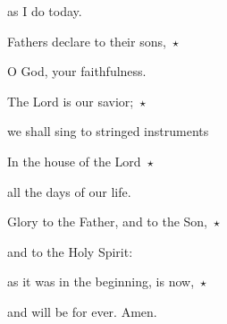 as I do today.

\noindent Fathers declare to their sons,~$\star$~\nopagebreak

O God, your faithfulness.

\noindent The Lord is our savior;~$\star$~\nopagebreak

we shall sing to stringed instruments

\noindent In the house of the Lord~$\star$~\nopagebreak

all the days of our life.

\noindent Glory to the Father, and to the Son,~$\star$~\nopagebreak

and to the Holy Spirit:

\noindent as it was in the beginning, is now,~$\star$~\nopagebreak

and will be for ever. Amen.